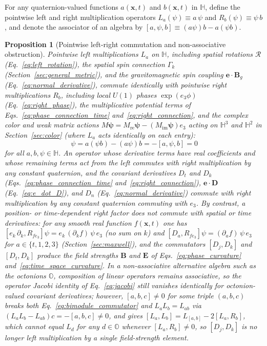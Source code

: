 \documentclass[aps,prd,onecolumn,tightenlines,nofootinbib,notitlepage,11pt,floatfix]{revtex4-2}
\theoremstyle{indentedtheorem}
\newtheorem{proposition}{Proposition}
\begin{document}
For any quaternion-valued functions $a(\mathbf{x},t)$ and $b(\mathbf{x},t)$ in $\mathbb{H}$, define the pointwise left and right multiplication operators $L_a(\psi)\equiv a\,\psi$ and $R_b(\psi)\equiv \psi\,b$, and denote the associator of an algebra by $[a,\psi,b]\equiv (a\psi)b - a(\psi b)$.

\begin{proposition}[Pointwise left-right commutation and non-associative obstruction]
\label{prop:bimodule_associativity}
Pointwise left multiplications $L_a$ on $\mathbb{H}$, including spatial rotations $\mathcal{R}$ (Eq.~\eqref{eq:left_rotation}), the spatial spin connection $\Gamma_k$ (Section~\ref{sec:general_metric}), and the gravitomagnetic spin coupling $\mathbf{e}\cdot\mathbf{B}_g$ (Eq.~\eqref{eq:normal_derivative}), commute identically with pointwise right multiplications $R_b$, including local $U(1)$ phases $\exp(e_3\phi)$ (Eq.~\eqref{eq:right_phase}), the multiplicative potential terms of Eqs.~\eqref{eq:phase_connection_time} and~\eqref{eq:right_connection}, and the complex color and weak matrix actions $M\boldsymbol{\psi}=M_\text{re}\boldsymbol{\psi}-(M_\text{im}\boldsymbol{\psi})e_3$ acting on $\mathbb{H}^3$ and $\mathbb{H}^2$ in Section~\ref{sec:color} (where $L_a$ acts identically on each entry):
\begin{equation}
    [L_a, R_b]\,\psi = a(\psi b) - (a\psi)b = -[a,\psi,b] = 0
    \label{eq:bimodule_commutator}
\end{equation}
for all $a,b,\psi\in\mathbb{H}$. An operator whose derivative terms have real coefficients and whose remaining terms act from the left commutes with right multiplication by any constant quaternion, and the covariant derivatives $D_t$ and $D_k$ (Eqs.~\eqref{eq:phase_connection_time} and~\eqref{eq:right_connection}), $\mathbf{e}\cdot\mathbf{D}$ (Eq.~\eqref{eq:e_dot_D}), and $D_n$ (Eq.~\eqref{eq:normal_derivative}) commute with right multiplication by any constant quaternion commuting with $e_3$. By contrast, a position- or time-dependent right factor does not commute with spatial or time derivatives: for any smooth real function $f(\mathbf{x},t)$ one has $[e_k\,\partial_k, R_{f e_3}]\psi = e_k\,(\partial_k f)\,\psi\,e_3$ (no sum on $k$) and $[D_a, R_{f e_3}]\psi = (\partial_a f)\,\psi\,e_3$ for $a\in\{t,1,2,3\}$ (Section~\ref{sec:maxwell}), and the commutators $[D_j,D_k]$ and $[D_t,D_k]$ produce the field strengths $\mathbf{B}$ and $\mathbf{E}$ of Eqs.~\eqref{eq:phase_curvature} and~\eqref{eq:time_space_curvature}. In a non-associative alternative algebra such as the octonions $\mathbb{O}$, composition of linear operators remains associative, so the operator Jacobi identity of Eq.~\eqref{eq:jacobi} still vanishes identically for octonion-valued covariant derivatives; however, $[a,b,c]\neq 0$ for some triple $(a,b,c)$ breaks both Eq.~\eqref{eq:bimodule_commutator} and $L_a L_b = L_{ab}$ via $(L_a L_b - L_{ab})c = -[a,b,c]\neq 0$, and gives $[L_a,L_b] = L_{[a,b]} - 2[L_a,R_b]$, which cannot equal $L_d$ for any $d\in\mathbb{O}$ whenever $[L_a,R_b]\neq 0$, so $[D_j,D_k]$ is no longer left multiplication by a single field-strength element.
\end{proposition}
\end{document}
